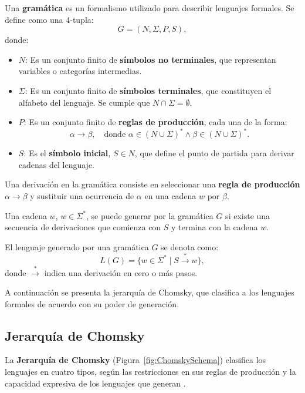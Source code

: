 Una \textbf{gramática} es un formalismo utilizado para describir lenguajes formales. Se define como una 4-tupla:
\[
  G = (N, \Sigma, P, S),
\]
donde:
\begin{itemize}
  \item \(N\): Es un conjunto finito de \textbf{símbolos no terminales}, que representan variables o categorías intermedias.
  \item \(\Sigma\): Es un conjunto finito de \textbf{símbolos terminales}, que constituyen el alfabeto del lenguaje. Se cumple que \(N \cap \Sigma = \emptyset\).
  \item \(P\): Es un conjunto finito de \textbf{reglas de producción}, cada una de la forma:
        \[
          \alpha \to \beta, \quad \text{donde } \alpha \in (N \cup \Sigma)^* \wedge \beta \in (N \cup \Sigma)^*.
        \]
  \item \(S\): Es el \textbf{símbolo inicial}, \(S \in N\), que define el punto de partida para derivar cadenas del lenguaje.
\end{itemize}

Una derivación en la gramática consiste en seleccionar una \textbf{regla de producción} $\alpha \to \beta$ y sustituir una ocurrencia de 
$\alpha$ en una cadena $w$ por $\beta$.

Una cadena $w$, $w\in\Sigma^*$,  se puede generar por la gramática $G$ si existe una secuencia de derivaciones que comienza con $S$
y termina con la cadena $w$.

El lenguaje generado por una gramática \(G\) se denota como:
\[
  L(G) = \{ w \in \Sigma^* \mid S \overset{*}{\to} w \},
\]
donde \(\overset{*}{\to}\) indica una derivación en cero o más pasos.

A continuación se presenta la jerarquía de Chomsky, que clasifica a los lenguajes formales de acuerdo con su poder de generación.

\subsection{Jerarquía de Chomsky}

La \textbf{Jerarquía de Chomsky} (Figura~\ref{fig:ChomskySchema}) clasifica los lenguajes en cuatro tipos, según las restricciones en sus reglas de producción y la capacidad expresiva de los lenguajes que generan \cite{geeksforgeeks_chomsky_hierarchy}.

